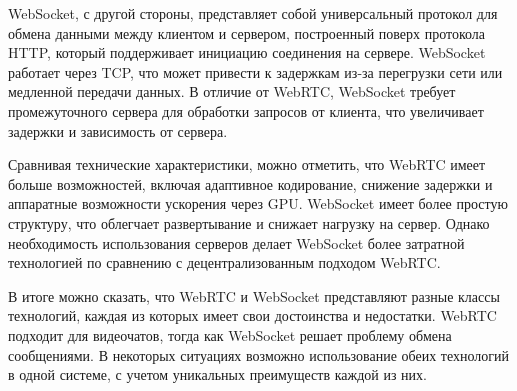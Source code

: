 WebSocket, с другой стороны, представляет собой универсальный протокол для обмена данными между клиентом и сервером, построенный поверх протокола HTTP, который поддерживает инициацию соединения на сервере. WebSocket работает через TCP, что может привести к задержкам из-за перегрузки сети или медленной передачи данных. В отличие от WebRTC, WebSocket требует промежуточного сервера для обработки запросов от клиента, что увеличивает задержки и зависимость от сервера.

Сравнивая технические характеристики, можно отметить, что WebRTC имеет больше возможностей, включая адаптивное кодирование, снижение задержки и аппаратные возможности ускорения через GPU. WebSocket имеет более простую структуру, что облегчает развертывание и снижает нагрузку на сервер. Однако необходимость использования серверов делает WebSocket более затратной технологией по сравнению с децентрализованным подходом WebRTC.

В итоге можно сказать, что WebRTC и WebSocket представляют разные классы технологий, каждая из которых имеет свои достоинства и недостатки. WebRTC подходит для видеочатов, тогда как WebSocket решает проблему обмена сообщениями. В некоторых ситуациях возможно использование обеих технологий в одной системе, с учетом уникальных преимуществ каждой из них.